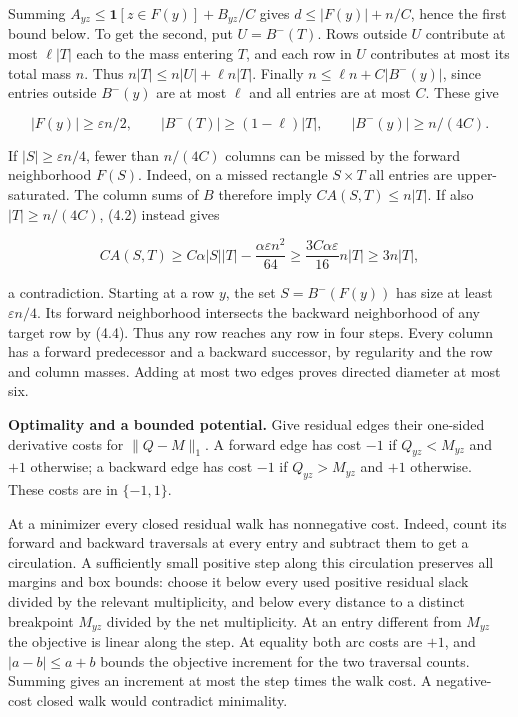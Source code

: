 \documentclass[english,11pt,a4paper]{article}
\begin{document}
Summing \(A_{yz}\le\mathbf1[z\in F(y)]+B_{yz}/C\) gives \(d\le |F(y)|+n/C\), hence the first bound below. To get the second, put \(U=B^-(T)\). Rows outside \(U\) contribute at most \(\ell|T|\) each to the mass entering \(T\), and each row in \(U\) contributes at most its total mass \(n\). Thus \(n|T|\le n|U|+\ell n|T|\). Finally \(n\le\ell n+C|B^-(y)|\), since entries outside \(B^-(y)\) are at most \(\ell\) and all entries are at most \(C\). These give

\nopagebreak[4]
\[|F(y)|\ge\varepsilon n/2,\qquad
|B^-(T)|\ge(1-\ell)|T|,\qquad |B^-(y)|\ge n/(4C).\tag{4.4}\]

If \(|S|\ge\varepsilon n/4\), fewer than \(n/(4C)\) columns can be missed by the forward neighborhood \(F(S)\). Indeed, on a missed rectangle \(S\times T\) all entries are upper-saturated. The column sums of \(B\) therefore imply \(CA(S,T)\le n|T|\). If also \(|T|\ge n/(4C)\), (4.2) instead gives

\nopagebreak[4]
\[CA(S,T)\ge C\alpha|S||T|-\frac{\alpha\varepsilon n^2}{64}
\ge\frac{3C\alpha\varepsilon}{16}n|T|\ge3n|T|,\tag{4.5}\]

a contradiction. Starting at a row \(y\), the set \(S=B^-(F(y))\) has size at least \(\varepsilon n/4\). Its forward neighborhood intersects the backward neighborhood of any target row by (4.4). Thus any row reaches any row in four steps. Every column has a forward predecessor and a backward successor, by regularity and the row and column masses. Adding at most two edges proves directed diameter at most six.

\textbf{Optimality and a bounded potential.} Give residual edges their one-sided derivative costs for \(\|Q-M\|_1\). A forward edge has cost \(-1\) if \(Q_{yz}<M_{yz}\) and \(+1\) otherwise; a backward edge has cost \(-1\) if \(Q_{yz}>M_{yz}\) and \(+1\) otherwise. These costs are in \(\{-1,1\}\).

At a minimizer every closed residual walk has nonnegative cost. Indeed, count its forward and backward traversals at every entry and subtract them to get a circulation. A sufficiently small positive step along this circulation preserves all margins and box bounds: choose it below every used positive residual slack divided by the relevant multiplicity, and below every distance to a distinct breakpoint \(M_{yz}\) divided by the net multiplicity. At an entry different from \(M_{yz}\) the objective is linear along the step. At equality both arc costs are \(+1\), and \(|a-b|\le a+b\) bounds the objective increment for the two traversal counts. Summing gives an increment at most the step times the walk cost. A negative-cost closed walk would contradict minimality.
\end{document}
